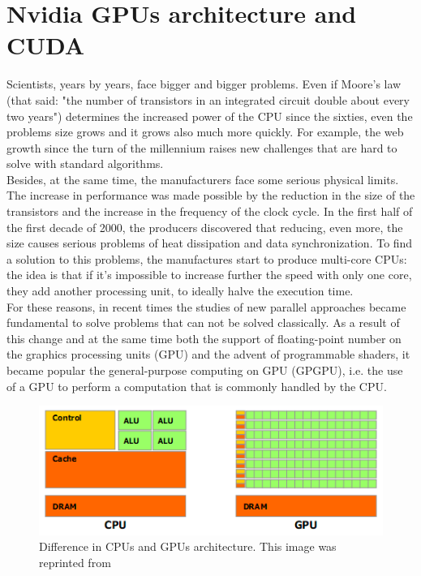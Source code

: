 \section{Nvidia GPUs architecture and CUDA}\label{C2}
Scientists, years by years, face bigger and bigger problems. 
Even if Moore's law (that said: "the number of transistors in an integrated circuit double about every two years") determines the increased power of the CPU since the sixties, even the problems size grows and it grows also much more quickly. For example, the web growth since the turn of the millennium raises new challenges that are hard to solve with standard algorithms.  \\
Besides, at the same time, the manufacturers face some serious physical limits. The increase in performance was made possible by the reduction in the size of the transistors and the increase in the frequency of the clock cycle. In the first half of the first decade of 2000, the producers discovered that reducing, even more, the size causes serious problems of heat dissipation and data synchronization. To find a solution to this problems, the manufactures start to produce multi-core CPUs: the idea is that if it's impossible to increase further the speed with only one core, they add another processing unit, to ideally halve the execution time.\\
For these reasons, in recent times the studies of new parallel approaches became fundamental to solve problems that can not be solved classically. As a result of this change and at the same time both the support of floating-point number on the graphics processing units (GPU) and the advent of programmable shaders, it became popular the general-purpose computing on GPU (GPGPU), i.e. the use of a GPU to perform a computation that is commonly handled by the CPU.\\
\begin{figure}[h]
	\centering
	\includegraphics[width=0.7\linewidth]{0-resources/cpugpuhardware}
	\caption{Difference in CPUs and GPUs architecture. This image was reprinted from \cite{cuda_manual} }
	\label{fig:cpugpuhardware}
\end{figure}
\\
